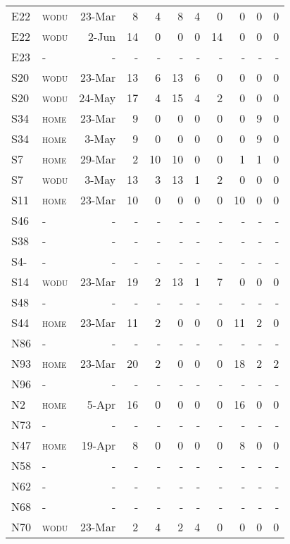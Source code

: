 {\begin{landscape}
\begin{Spacing}{1}
\begin{longtable}[l]{@{}llrrrrrrrrr}
E22 & \textsc{wodu} & 23-Mar & 8 & 4 & 8 & 4 & 0 & 0 & 0 & 0 \tabularnewline
E22 & \textsc{wodu} & 2-Jun & 14 & 0 & 0 & 0 & 14 & 0 & 0 & 0 \tabularnewline
E23 & - & - & - & - & - & - & - & - & - & - \tabularnewline
S20 & \textsc{wodu} & 23-Mar & 13 & 6 & 13 & 6 & 0 & 0 & 0 & 0 \tabularnewline
S20 & \textsc{wodu} & 24-May & 17 & 4 & 15 & 4 & 2 & 0 & 0 & 0 \tabularnewline
S34 & \textsc{home} & 23-Mar & 9 & 0 & 0 & 0 & 0 & 0 & 9 & 0 \tabularnewline
S34 & \textsc{home} & 3-May & 9 & 0 & 0 & 0 & 0 & 0 & 9 & 0 \tabularnewline
S7 & \textsc{home} & 29-Mar & 2 & 10 & 10 & 0 & 0 & 1 & 1 & 0 \tabularnewline
S7 & \textsc{wodu} & 3-May & 13 & 3 & 13 & 1 & 2 & 0 & 0 & 0 \tabularnewline
S11 & \textsc{home} & 23-Mar & 10 & 0 & 0 & 0 & 0 & 10 & 0 & 0 \tabularnewline
S46 & - & - & - & - & - & - & - & - & - & - \tabularnewline
S38 & - & - & - & - & - & - & - & - & - & - \tabularnewline
S4- & - & - & - & - & - & - & - & - & - & - \tabularnewline
S14 & \textsc{wodu} & 23-Mar & 19 & 2 & 13 & 1 & 7 & 0 & 0 & 0 \tabularnewline
S48 & - & - & - & - & - & - & - & - & - & - \tabularnewline
S44 & \textsc{home} & 23-Mar & 11 & 2 & 0 & 0 & 0 & 11 & 2 & 0 \tabularnewline
N86 & - & - & - & - & - & - & - & - & - & - \tabularnewline
N93 & \textsc{home} & 23-Mar & 20 & 2 & 0 & 0 & 0 & 18 & 2 & 2 \tabularnewline
N96 & - & - & - & - & - & - & - & - & - & - \tabularnewline
N2 & \textsc{home} & 5-Apr & 16 & 0 & 0 & 0 & 0 & 16 & 0 & 0 \tabularnewline
N73 & - & - & - & - & - & - & - & - & - & - \tabularnewline
N47 & \textsc{home} & 19-Apr & 8 & 0 & 0 & 0 & 0 & 8 & 0 & 0 \tabularnewline
N58 & - & - & - & - & - & - & - & - & - & - \tabularnewline
N62 & - & - & - & - & - & - & - & - & - & - \tabularnewline
N68 & - & - & - & - & - & - & - & - & - & - \tabularnewline
N70 & \textsc{wodu} & 23-Mar & 2 & 4 & 2 & 4 & 0 & 0 & 0 & 0 \tabularnewline\bottomrule
\end{longtable}
\end{Spacing}
\end{landscape}
\clearpage
}